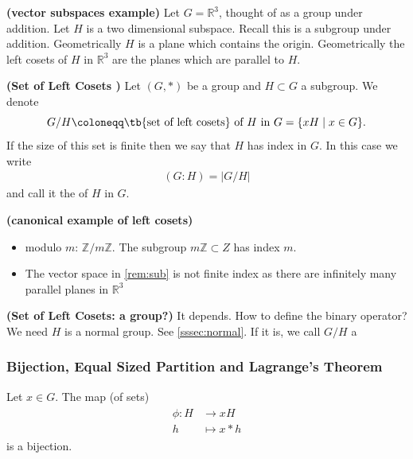 \documentclass{article}
\newcommand{\bfs}[1]{\textbf{({#1}) }}
\begin{document}
\begin{exma}{\bfs{vector subspaces example}}\label{rem:sub}
Let $G=\mathbb{R}^{3}$, thought of as a group under addition. Let $H$ is a two dimensional subspace. Recall this is a subgroup under addition. Geometrically $H$ is a plane which contains the origin. Geometrically the left cosets of $H$ in $\mathbb{R}^{3}$ are the planes which are parallel to $H .$
\end{exma}
\begin{defa}{\bfs{Set of Left Cosets }}
    Let $(G, *)$ be a group and $H \subset G$ a subgroup. We denote 
    $$G / H \coloneqq \text{\tb{set of left cosets} of } H \text{ in }G = \{xH\mid x\in G\}.$$ If the size of this set is finite then we say that $H$ has  index in $G$. In this case we write
\begin{align*}
(G: H)=|G / H|
\end{align*}
and call it the  of $H$ in $G$.
\end{defa} 
\begin{exma}{\bfs{canonical example of left cosets}}
\begin{itemize}
    \item {} modulo $m$: $\mathbb{Z} / m\mathbb{Z}$.  The subgroup $m \mathbb{Z} \subset Z$ has index $m$. 
    \item  The vector space in \cref{rem:sub} is not finite index as there are infinitely many parallel planes in $\mathbb{R}^{3}$
\end{itemize}

\end{exma}
\begin{rema}{\bfs{Set of Left Cosets: a group?}}
It depends. How to define the binary operator? We need $H$ is a normal group. See \cref{sssec:normal}. If it is, we call $G/H$ a 
\end{rema}
\subsubsection{Bijection, Equal Sized Partition and Lagrange's Theorem}\label{sect:bi_eq}
\begin{thma}
Let $x \in G$. The map (of sets)
\begin{align*}
\begin{aligned}
\phi: H & \rightarrow x H \\
h & \mapsto x * h
\end{aligned}
\end{align*}
is a bijection.
\end{thma} 
\end{document}
